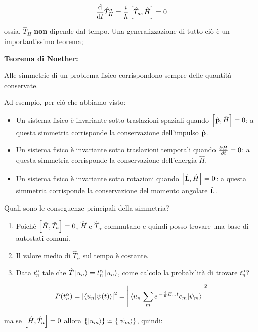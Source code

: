 \begin{align*}
	\dv{t} \hat{T}_H^a = \frac{i}{\hbar} \, \qty[\hat{T}_a, \hat{H}] = 0
\end{align*}

	ossia, $\hat{T}_H$ \textbf{non} dipende dal tempo. Una generalizzazione di tutto ciò è un importantissimo teorema;
	
\begin{myth}
	\textbf{Teorema di Noether:}
		
		Alle simmetrie di un problema fisico corrispondono sempre delle quantità conservate.
\end{myth}

	Ad esempio, per ciò che abbiamo visto:
	
\begin{itemize}
	\item Un sistema fisico è invariante sotto traslazioni spaziali quando $\qty[\hat{\vb{p}}, \hat{H}] = 0$: a questa simmetria corrisponde la conservazione dell'impulso $\hat{\vb{p}}$.
	\item Un sistema fisico è invariante sotto traslazioni temporali quando $\pdv{\hat{H}}{t} = 0$: a questa simmetria corrisponde la conservazione dell'energia $\hat{H}$.
	\item Un sistema fisico è invariante sotto rotazioni quando $\qty[\hat{\vb{L}}, \hat{H}] = 0$: a questa simmetria corrisponde la conservazione del momento angolare $\hat{\vb{L}}$.
\end{itemize}
	
	Quali sono le conseguenze principali della simmetria?
	
\begin{enumerate}
	\item Poiché $\qty[\hat{H}, \hat{T}_a] = 0$, $\hat{H}$ e $\hat{T}_{\alpha}$ commutano e quindi posso trovare una base di autostati comuni.
	\item Il valore medio di $\hat{T}_{\alpha}$ sul tempo è costante.
	\item Data $t^{\alpha}_{n}$ tale che $\hat{T}\ket{u_n} = t_n^{\alpha} \ket{u_n}$, come calcolo la probabilità di trovare $t_n^{\alpha}$?
\end{enumerate}

\begin{align*}
	P\qty(t_n^{\alpha}) = \qty|\braket{u_n}{\psi\qty(t)}|^2 = \qty|\mel{u_n}{\sum_m e^{\, - \frac{i}{\hbar} E_m t } c_m}{\psi_m}|^2
\end{align*}

	ma se $\qty[\hat{H}, \hat{T}_a] = 0$ allora $\qty{\ket{u_m}} \simeq \qty{\ket{\psi_m}}$, quindi:
	
